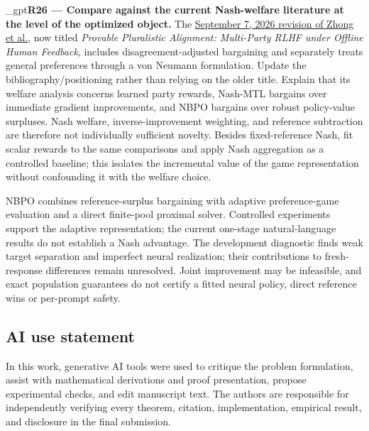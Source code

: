 \documentclass{article}
\newif\ifshowreviews
\newcommand{\reviewresponse}[1]{%
  \ifshowreviews
  \par\begingroup\color{blue!65!black}\hypersetup{allcolors=blue!65!black}\emergencystretch=2em%
  \noindent\textbf{Response:} #1\par\endgroup
  \fi}
\theoremstyle{remark}
\theoremstyle{plain}
\newcommand{\NBPO}{\textsc{NBPO}}
\begin{document}
\kekim_gpt{\textbf{R26 --- Compare against the current Nash-welfare literature at the level of the optimized object.} The \href{https://arxiv.org/abs/2403.05006v2}{September 7, 2026 revision of Zhong et al.}, now titled \emph{Provable Pluralistic Alignment: Multi-Party RLHF under Offline Human Feedback}, includes disagreement-adjusted bargaining and separately treats general preferences through a von Neumann formulation. Update the bibliography/positioning rather than relying on the older title. Explain that its welfare analysis concerns learned party rewards, Nash-MTL bargains over immediate gradient improvements, and NBPO bargains over robust policy-value surpluses. Nash welfare, inverse-improvement weighting, and reference subtraction are therefore not individually sufficient novelty. Besides fixed-reference Nash, fit scalar rewards to the same comparisons and apply Nash aggregation as a controlled baseline; this isolates the incremental value of the game representation without confounding it with the welfare choice.}
\reviewresponse{\textbf{R26 --- Partially addressed.} Related Work distinguishes welfare over learned party rewards, von Neumann solutions, gradient bargaining and robust policy-value surpluses. BT-RM--Nash is included in controlled and UF comparisons. The natural results and direct-feedback audit do not establish a representation advantage; Nash welfare, reference subtraction and inverse-surplus weighting are not presented as individually novel.}

\NBPO{} combines reference-surplus bargaining with adaptive preference-game evaluation and a direct finite-pool proximal solver. Controlled experiments support the adaptive representation; the current one-stage natural-language results do not establish a Nash advantage. The development diagnostic finds weak target separation and imperfect neural realization; their contributions to fresh-response differences remain unresolved. Joint improvement may be infeasible, and exact population guarantees do not certify a fitted neural policy, direct reference wins or per-prompt safety.

\subsection*{AI use statement}
In this work, generative AI tools were used to critique the problem formulation, assist with mathematical derivations and proof presentation, propose experimental checks, and edit manuscript text. The authors are responsible for independently verifying every theorem, citation, implementation, empirical result, and disclosure in the final submission.
\end{document}
